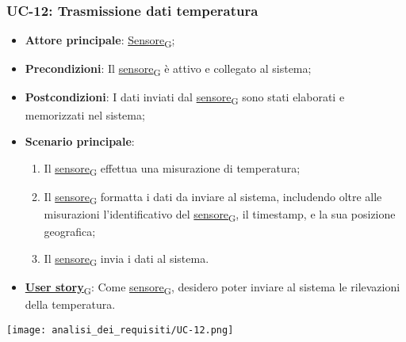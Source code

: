 \subsubsection{UC-12: Trasmissione dati temperatura}
\begin{itemize}
	\item \textbf{Attore principale}: \href{https://7last.github.io/docs/rtb/documentazione-interna/glossario\#sensore}{Sensore\textsubscript{G}};
	\item \textbf{Precondizioni}: Il \href{https://7last.github.io/docs/rtb/documentazione-interna/glossario\#sensore}{sensore\textsubscript{G}} è attivo e collegato al sistema;
	\item \textbf{Postcondizioni}: I dati inviati dal \href{https://7last.github.io/docs/rtb/documentazione-interna/glossario\#sensore}{sensore\textsubscript{G}} sono stati elaborati e memorizzati nel sistema;
	\item \textbf{Scenario principale}:
	      \begin{enumerate}
		      \item Il \href{https://7last.github.io/docs/rtb/documentazione-interna/glossario\#sensore}{sensore\textsubscript{G}} effettua una misurazione di temperatura;
		      \item Il \href{https://7last.github.io/docs/rtb/documentazione-interna/glossario\#sensore}{sensore\textsubscript{G}} formatta i dati da inviare al sistema, includendo oltre alle misurazioni l'identificativo del \href{https://7last.github.io/docs/rtb/documentazione-interna/glossario\#sensore}{sensore\textsubscript{G}},
		            il timestamp, e la sua posizione geografica;
		      \item Il \href{https://7last.github.io/docs/rtb/documentazione-interna/glossario\#sensore}{sensore\textsubscript{G}} invia i dati al sistema.
	      \end{enumerate}
	\item \href{https://7last.github.io/docs/rtb/documentazione-interna/glossario\#user-story}{\textbf{User story}\textsubscript{G}}: Come \href{https://7last.github.io/docs/rtb/documentazione-interna/glossario\#sensore}{sensore\textsubscript{G}}, desidero poter inviare al sistema le rilevazioni della temperatura.
\end{itemize}

\begin{center}
	\texttt{[image: analisi\_dei\_requisiti/UC-12.png]}
\end{center}

